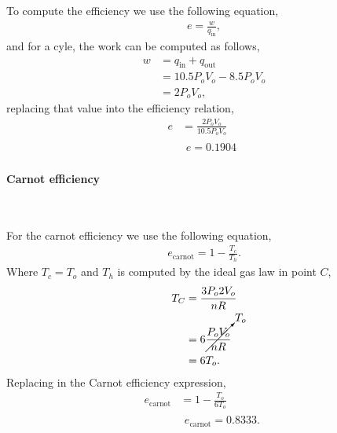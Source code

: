 \documentclass[main.tex]{subfiles}
\begin{document}
To compute the efficiency we use the following equation,
\begin{gather*}
    e = \frac{w}{q_{\mathrm{in}}},
\end{gather*}
and for a cyle, the work can be computed as follows,
\begin{align*}
    w &= q_{\mathrm{in}} + q_{\mathrm{out}} \\
    &= 10.5P_oV_o - 8.5P_oV_o \\
    &= 2P_oV_o,
\end{align*}
replacing that value into the efficiency relation,
\begin{align*}
    e &= \frac{2P_oV_o}{10.5P_oV_o} \\
    &\begin{gathered}
        \boxed{e = 0.1904}
    \end{gathered}
\end{align*}

\paragraph{Carnot efficiency}~

For the carnot efficiency we use the following equation,
\begin{gather*}
    e_{\mathrm{carnot}} = 1-\frac{T_c}{T_h}.
\end{gather*}
Where $T_c = T_o$ and $T_h$ is computed by the ideal gas law in point $C$,
\begin{align*}
    T_C & = \frac{3P_o2V_o}{nR} \\
    &= 6\cancelto{T_o}{\frac{P_oV_o}{nR}} \\
    &= 6T_o.
\end{align*}
Replacing in the Carnot efficiency expression,
\begin{align*}
    e_{\mathrm{carnot}} &= 1-\frac{T_o}{6T_o} \\
    &\begin{gathered}
        \boxed{e_{\mathrm{carnot}} = 0.8333.}
    \end{gathered}
\end{align*}

\end{document}
